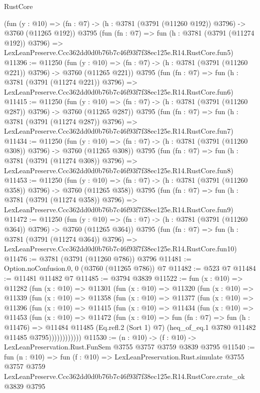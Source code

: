 \begin{lexlean}{RustCore}
\begin{coremodule}
    (fun (y : @10) => (fn : @7) -> (h : @3781 (@3791 (@11260 @192)) @3796) -> @3760 (@11265 @192))
    @3795
    (fun (fn : @7) =>
    fun (h : @3781 (@3791 (@11274 @192)) @3796) =>
    LexLeanPreserve.Ccc362dd0d0b76b7c46f93f7f38ec125e.R14.RustCore.fun5)
@11396 := @11250
    (fun (y : @10) => (fn : @7) -> (h : @3781 (@3791 (@11260 @221)) @3796) -> @3760 (@11265 @221))
    @3795
    (fun (fn : @7) =>
    fun (h : @3781 (@3791 (@11274 @221)) @3796) =>
    LexLeanPreserve.Ccc362dd0d0b76b7c46f93f7f38ec125e.R14.RustCore.fun6)
@11415 := @11250
    (fun (y : @10) => (fn : @7) -> (h : @3781 (@3791 (@11260 @287)) @3796) -> @3760 (@11265 @287))
    @3795
    (fun (fn : @7) =>
    fun (h : @3781 (@3791 (@11274 @287)) @3796) =>
    LexLeanPreserve.Ccc362dd0d0b76b7c46f93f7f38ec125e.R14.RustCore.fun7)
@11434 := @11250
    (fun (y : @10) => (fn : @7) -> (h : @3781 (@3791 (@11260 @308)) @3796) -> @3760 (@11265 @308))
    @3795
    (fun (fn : @7) =>
    fun (h : @3781 (@3791 (@11274 @308)) @3796) =>
    LexLeanPreserve.Ccc362dd0d0b76b7c46f93f7f38ec125e.R14.RustCore.fun8)
@11453 := @11250
    (fun (y : @10) => (fn : @7) -> (h : @3781 (@3791 (@11260 @358)) @3796) -> @3760 (@11265 @358))
    @3795
    (fun (fn : @7) =>
    fun (h : @3781 (@3791 (@11274 @358)) @3796) =>
    LexLeanPreserve.Ccc362dd0d0b76b7c46f93f7f38ec125e.R14.RustCore.fun9)
@11472 := @11250
    (fun (y : @10) => (fn : @7) -> (h : @3781 (@3791 (@11260 @364)) @3796) -> @3760 (@11265 @364))
    @3795
    (fun (fn : @7) =>
    fun (h : @3781 (@3791 (@11274 @364)) @3796) =>
    LexLeanPreserve.Ccc362dd0d0b76b7c46f93f7f38ec125e.R14.RustCore.fun10)
@11476 := @3781 (@3791 (@11260 @786)) @3796
@11481 := Option.noConfusion.{0, 0} (@3760 (@11265 @786)) @7
@11482 := @523 @7
@11484 := @11481 @11482 @7
@11485 := @3794 @3839
@11522 := fun (x : @10) =>
  @11282
    (fun (x : @10) =>
    @11301
      (fun (x : @10) =>
      @11320
        (fun (x : @10) =>
        @11339
          (fun (x : @10) =>
          @11358
            (fun (x : @10) =>
            @11377
              (fun (x : @10) =>
              @11396
                (fun (x : @10) =>
                @11415
                  (fun (x : @10) =>
                  @11434
                    (fun (x : @10) =>
                    @11453
                      (fun (x : @10) =>
                      @11472
                        (fun (x : @10) =>
                        fun (fn : @7) =>
                        fun (h : @11476) =>
                        @11484
                          @11485
                          (Eq.refl.{2} (Sort 1) @7)
                          (heq_of_eq.{1} @3780 @11482 @11485 @3795))))))))))))
@11530 := (n : @10) -> (f : @10) -> LexLeanPreservation.Rust.FunSem @3755 @3757 @3759 @3839 @3795
@11540 := fun (n : @10) =>
  fun (f : @10) =>
  LexLeanPreservation.Rust.simulate
    @3755
    @3757
    @3759
    LexLeanPreserve.Ccc362dd0d0b76b7c46f93f7f38ec125e.R14.RustCore.crate_ok
    @3839
    @3795
\end{coremodule}
\end{lexlean}
